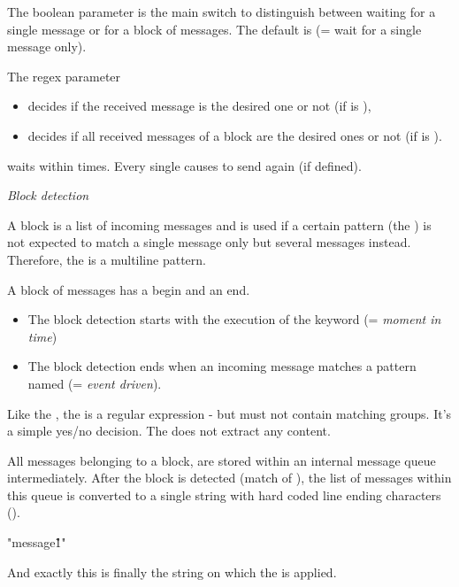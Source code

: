 \vspace{2ex}

The boolean parameter  is the main switch to distinguish between waiting for a single message
or for a block of messages. The default is  (= wait for a single message only).

The regex parameter 
\begin{itemize}
   \item decides if the received message is the desired one or not (if  is ),
   \item decides if all received messages of a block are the desired ones or not (if  is ).
\end{itemize}

 waits within   times. Every single  causes 
to send  again (if defined).

\newpage

\textit{Block detection}

A block is a list of incoming messages and is used if a certain pattern (the ) is not expected to match a single message only but
several messages instead. Therefore, the  is a multiline pattern.

A block of messages has a begin and an end.
\begin{itemize}
   \item The block detection starts with the execution of the  keyword (= \textit{moment in time})
   \item The block detection ends when an incoming message matches a pattern named  (= \textit{event driven}).
\end{itemize}

Like the , the  is a regular expression - but must not contain matching groups. It's a simple
yes/no decision. The  does not extract any content.

All messages belonging to a block, are stored within an internal message queue intermediately. After the block is detected (match of ),
the list of messages within this queue is converted to a single string with hard coded line ending characters (\rcode{\\r\\n}).
\begin{robotcode}
"message1\r{}\r{}\r{}"
\end{robotcode}
And exactly this is finally the string on which the  is applied.

